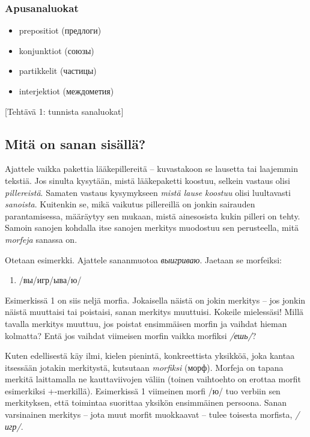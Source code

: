 \subsubsection{Apusanaluokat}\label{apusanaluokat}

\begin{itemize}
\itemsep1pt\parskip0pt
\item
  prepositiot (предлоги)
\item
  konjunktiot (союзы)
\item
  partikkelit (частицы)
\item
  interjektiot (междометия)
\end{itemize}

{[}Tehtävä 1: tunnista sanaluokat{]}

\subsection{Mitä on sanan
sisällä?}\label{mituxe4-on-sanan-sisuxe4lluxe4}

Ajattele vaikka pakettia lääkepillereitä -- kuvastakoon se lausetta tai
laajemmin tekstiä. Jos sinulta kysytään, mistä lääkepaketti koostuu,
selkein vastaus olisi \emph{pillereistä}. Samaten vastaus kysymykseen
\emph{mistä lause koostuu} olisi luultavasti \emph{sanoista}. Kuitenkin
se, mikä vaikutus pillereillä on jonkin sairauden parantamisessa,
määräytyy sen mukaan, mistä ainesosista kukin pilleri on tehty. Samoin
sanojen kohdalla itse sanojen merkitys muodostuu sen perusteella, mitä
\emph{morfeja} sanassa on.

Otetaan esimerkki. Ajattele sananmuotoa \emph{выигриваю}. Jaetaan se
morfeiksi:

\begin{enumerate}
\def\labelenumi{(\arabic{enumi})}
\itemsep1pt\parskip0pt
\item
  /вы/игр/ыва/ю/
\end{enumerate}

Esimerkissä 1 on siis neljä morfia. Jokaisella näistä on jokin merkitys
-- jos jonkin näistä muuttaisi tai poistaisi, sanan merkitys muuttuisi.
Kokeile mielessäsi! Millä tavalla merkitys muuttuu, jos poistat
ensimmäisen morfin ja vaihdat hieman kolmatta? Entä jos vaihdat
viimeisen morfin vaikka morfiksi \emph{/ешь/}?

Kuten edellisestä käy ilmi, kielen pienintä, konkreettista yksikköä,
joka kantaa itsessään jotakin merkitystä, kutsutaan \emph{morfiksi}
(морф). Morfeja on tapana merkitä laittamalla ne kauttaviivojen väliin
(toinen vaihtoehto on erottaa morfit esimerkiksi +-merkillä).
Esimerkissä 1 viimeinen morfi /ю/ tuo verbiin sen merkityksen, että
toimintaa suorittaa yksikön ensimmäinen persoona. Sanan varsinainen
merkitys -- jota muut morfit muokkaavat -- tulee toisesta morfista,
\emph{/игр/}.

